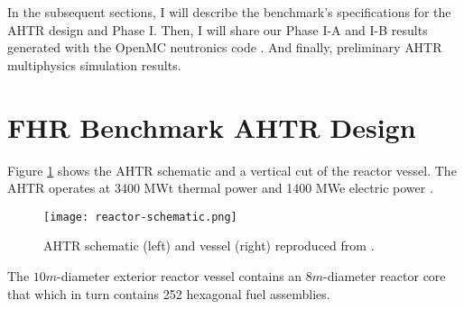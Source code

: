 In the subsequent sections, I will describe the benchmark's specifications for 
the \gls{AHTR} design and Phase I. Then, I will share our Phase I-A and I-B 
results generated with the OpenMC neutronics code \cite{romano_openmc_2013}. 
And finally, preliminary \gls{AHTR} multiphysics simulation results.  

\section{FHR Benchmark \acrlong{AHTR} Design}
Figure \ref{fig:reactor-schematic} shows the \acrfull{AHTR} schematic and a vertical 
cut of the reactor vessel. 
The \gls{AHTR} operates at 3400 MWt thermal power and 1400 MWe 
electric power \cite{varma_ahtr_2012}. 
\begin{figure}[htbp]
    \centering
    \texttt{[image: reactor-schematic.png]} 
    \caption{\acrfull{AHTR} schematic (left) and vessel (right) reproduced from
    \cite{petrovic_benchmark_2021}.}
    \label{fig:reactor-schematic}
\end{figure}
The $10m$-diameter exterior reactor vessel contains an $8m$-diameter 
reactor core that which in turn contains 252 hexagonal fuel assemblies.

